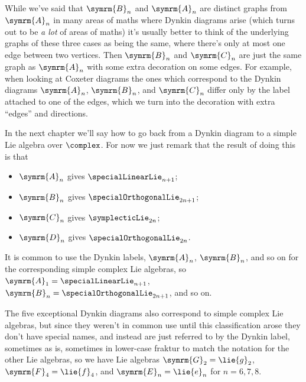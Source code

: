 \documentclass[fleqn]{NotesClass}
\newcommand{\dynkin}[2]{\symrm{#1}_{#2}}
\begin{document}
    \begin{remark}{}{}
        While we've said that \(\dynkin{B}{n}\) and \(\dynkin{A}{n}\) are distinct graphs from \(\dynkin{A}{n}\) in many areas of maths where Dynkin diagrams arise (which turns out to be \emph{a lot} of areas of maths) it's usually better to think of the underlying graphs of these three cases as being the same, where there's only at most one edge between two vertices.
        Then \(\dynkin{B}{n}\) and \(\dynkin{C}{n}\) are just the same graph as \(\dynkin{A}{n}\) with some extra decoration on some edges.
        For example, when looking at Coxeter diagrams the ones which correspond to the Dynkin diagrams \(\dynkin{A}{n}\), \(\dynkin{B}{n}\), and \(\dynkin{C}{n}\) differ only by the label attached to one of the edges, which we turn into the decoration with extra \enquote{edges} and directions.
    \end{remark}
    
    In the next chapter we'll say how to go back from a Dynkin diagram to a simple Lie algebra over \(\complex\).
    For now we just remark that the result of doing this is that
    \begin{itemize}
        \item \(\dynkin{A}{n}\) gives \(\specialLinearLie_{n+1}\);
        \item \(\dynkin{B}{n}\) gives \(\specialOrthogonalLie_{2n + 1}\);
        \item \(\dynkin{C}{n}\) gives \(\symplecticLie_{2n}\);
        \item \(\dynkin{D}{n}\) gives \(\specialOrthogonalLie_{2n}\).
    \end{itemize}
    It is common to use the Dynkin labels, \(\dynkin{A}{n}\), \(\dynkin{B}{n}\), and so on for the corresponding simple complex Lie algebras, so \(\dynkin{A}{1} = \specialLinearLie_{n+1}\), \(\dynkin{B}{n} = \specialOrthogonalLie_{2n + 1}\), and so on.
    
    The five exceptional Dynkin diagrams also correspond to simple complex Lie algebras, but since they weren't in common use until this classification arose they don't have special names, and instead are just referred to by the Dynkin label, sometimes as is, sometimes in lower-case fraktur to match the notation for the other Lie algebras, so we have Lie algebras \(\dynkin{G}{2} = \lie{g}_2\), \(\dynkin{F}{4} = \lie{f}_4\), and \(\dynkin{E}{n} = \lie{e}_n\) for \(n = 6, 7, 8\).
    
\end{document}
